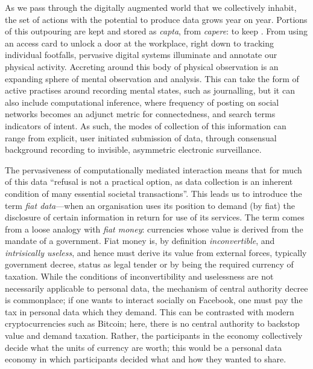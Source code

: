 \documentclass{IOS-Book-Article}     %
\newcommand{\tbox}[3][red]{{
\color{#1}\noindent{
   \fbox{\scriptsize{ {\bf #2} \textsl{#3}}}
   \vspace{2pt}
}
}}
\newcommand{\todo}[1]{\tbox{TODO:}{#1}}
\begin{document}
As we pass through the digitally augmented world that we collectively inhabit,
the set of actions with the potential to produce data grows year on year.
Portions of this outpouring are kept and stored as
\emph{capta}, from \emph{capere}: to keep \cite{dodge2005codes}. From
using an access card to unlock a door at the workplace, right down to tracking
individual footfalls, pervasive digital systems illuminate and annotate our
physical activity. Accreting around this body of physical observation is an
expanding sphere of mental observation and analysis. This can take the form of
active practises around recording mental states, such as journalling, but it can
also include computational inference, where frequency of posting on social
networks becomes an adjunct metric for connectedness, and search terms 
indicators of intent. As such, the modes of collection of this information can
range from explicit, user initiated submission of data, through consensual
background recording to invisible, asymmetric electronic surveillance.

The pervasiveness of computationally mediated interaction means that for much of
this data ``refusal is not a practical option, as data collection is an
inherent condition of many essential societal
transactions''\cite{brunton2011vernacular}. This leads us to introduce the term \emph{fiat data}---when an
organisation uses its position to demand (by fiat) the disclosure of certain
information in return for use of its services. The term comes from a loose
analogy with \emph{fiat money}: currencies whose value is derived from the
mandate of a government. 
\todo{this is gibberish, needs rewriting!}
Fiat money is, by definition
\emph{inconvertible}, and \emph{intrisically useless}, and hence must derive
its value from external forces, typically government decree, status as legal
tender or by being the required currency of taxation. While the conditions of
inconvertibility and uselessness are not necessarily applicable to personal
data, the mechanism of central authority decree is commonplace; if one wants to
interact socially on Facebook, one must pay the tax in personal data which they
demand. This can be contrasted with modern cryptocurrencies such as Bitcoin;
here, there is no central authority to backstop value and demand taxation.
Rather, the participants in the economy collectively decide what the units
of currency are worth; this would be a personal data economy in which
participants decided what and how they wanted to share.
\end{document}
